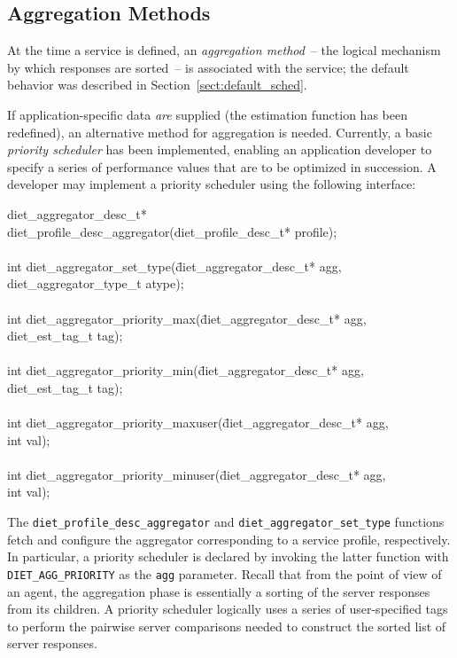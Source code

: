\subsection{Aggregation Methods}\label{sect:agg_methods}

At the time a \diet service is defined, an \emph{aggregation method}~-- the
logical mechanism by which {\sed} responses are sorted~-- is associated with
the service; the default behavior was described in
Section~\ref{sect:default_sched}.

If application-specific data \emph{are} supplied (\ie the estimation function
has been redefined), an alternative method for aggregation is needed.
Currently, a basic \emph{priority scheduler} has been implemented, enabling an
application developer to specify a series of performance values that are to be
optimized in succession.  A developer may implement a priority scheduler using
the following interface:
\begin{code}
\begin{tabbing}
diet\_aggregator\_desc\_t* \\
diet\_profile\_desc\_aggregator(diet\_profile\_desc\_t* profile); \\
\\
int diet\_aggregator\_set\_type(\=diet\_aggregator\_desc\_t* agg, \\
\> diet\_aggregator\_type\_t atype); \\
\\
int diet\_aggregator\_priority\_max(\=diet\_aggregator\_desc\_t* agg, \\
\> diet\_est\_tag\_t tag); \\
\\
int diet\_aggregator\_priority\_min(\=diet\_aggregator\_desc\_t* agg, \\
\> diet\_est\_tag\_t tag); \\
\\
int diet\_aggregator\_priority\_maxuser(\=diet\_aggregator\_desc\_t* agg, \\
\> int val); \\
\\
int diet\_aggregator\_priority\_minuser(\=diet\_aggregator\_desc\_t* agg, \\
\> int val); \\
\end{tabbing}
\end{code}
The \texttt{diet\_profile\_desc\_aggregator} and
\texttt{diet\_aggregator\_set\_type} functions fetch and configure the
aggregator corresponding to a \diet service profile, respectively.  In
particular, a priority scheduler is declared by invoking the latter function
with \texttt{DIET\_AGG\_PRIORITY} as the \texttt{agg} parameter.  Recall that
from the point of view of an agent, the aggregation phase is essentially a
sorting of the server responses from its children.  A priority scheduler
logically uses a series of user-specified tags to perform the pairwise server
comparisons needed to construct the sorted list of server responses.

